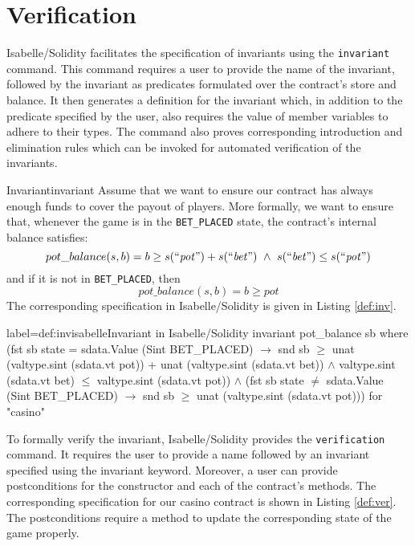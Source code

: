 \documentclass[a4paper,UKenglish,cleveref, autoref, thm-restate]{oasics-v2021}
\begin{document}
%
%

%
%
\section{Verification}
%
%
%
Isabelle/Solidity facilitates the specification of invariants using the \texttt{\color{isarblue}invariant} command.
This command requires a user to provide the name of the invariant, followed by the invariant as predicates formulated over the contract's store and balance.
It then generates a definition for the invariant which, in addition to the predicate specified by the user, also requires the value of member variables to adhere to their types.
The command also proves corresponding  introduction and elimination rules which can be invoked for automated verification of the invariants.

\begin{Example}{Invariant}{invariant}
	Assume that we want to ensure our contract has always enough funds to cover the payout of players.
  More formally, we want to ensure that, whenever the game is in the \texttt{BET\_PLACED} state, the contract's internal balance satisfies:
	\begin{equation}
	  pot\_balance(s, b)=b \ge s(\text{``$\mathit{pot}$''}) + s(\text{``$\mathit{bet}$''})~\wedge~s(\text{``$\mathit{bet}$''}) \leq s(\text{``$\mathit{pot}$''})
	\end{equation}\label{eq:inv}
  and if it is not in \texttt{BET\_PLACED}, then 
  \begin{equation}
		pot\_balance(s, b)=b \ge pot 
  \end{equation}\label{eq:inv1}
%
The corresponding specification in Isabelle/Solidity is given in Listing \ref{def:inv}.
\begin{code}{label={def:inv}}{isabelle}{Invariant in Isabelle/Solidity}
invariant pot_balance sb where
  (fst sb state = sdata.Value (Sint BET_PLACED)
    $\longrightarrow$ snd sb $\geq$ unat (valtype.sint (sdata.vt pot)) 
	                + unat (valtype.sint (sdata.vt bet))
        $\wedge$ valtype.sint (sdata.vt bet) $\leq$ valtype.sint (sdata.vt pot)) $\wedge$
  (fst sb state $\neq$ sdata.Value (Sint BET_PLACED)
    $\longrightarrow$  snd sb $\geq$ unat (valtype.sint (sdata.vt pot)))
  for "casino"
\end{code}
\end{Example}
%

%
To formally verify the invariant, Isabelle/Solidity provides the \texttt{\color{isarblue}verification} command. 
%
It requires the user to provide a name followed by an invariant specified using the invariant keyword.
Moreover, a user can provide postconditions for the constructor and each of the contract's methods.
The corresponding specification for our casino contract is shown in Listing \ref{def:ver}.
The postconditions require a method to update the corresponding state of the game properly.
\end{document}
